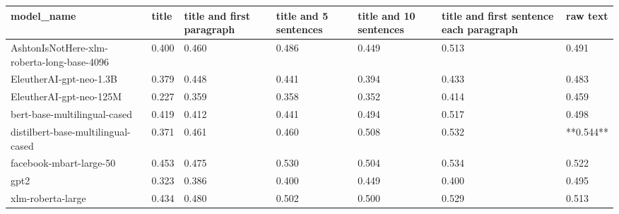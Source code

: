 \begin{tabular}{lllllll}
\toprule
                                model\_name & title & title and first paragraph & title and 5 sentences & title and 10 sentences & title and first sentence each paragraph &  raw text \\
\midrule
AshtonIsNotHere-xlm-roberta-long-base-4096 & 0.400 &                     0.460 &                 0.486 &                  0.449 &                                   0.513 &     0.491 \\
                   EleutherAI-gpt-neo-1.3B & 0.379 &                     0.448 &                 0.441 &                  0.394 &                                   0.433 &     0.483 \\
                   EleutherAI-gpt-neo-125M & 0.227 &                     0.359 &                 0.358 &                  0.352 &                                   0.414 &     0.459 \\
              bert-base-multilingual-cased & 0.419 &                     0.412 &                 0.441 &                  0.494 &                                   0.517 &     0.498 \\
        distilbert-base-multilingual-cased & 0.371 &                     0.461 &                 0.460 &                  0.508 &                                   0.532 & **0.544** \\
                   facebook-mbart-large-50 & 0.453 &                     0.475 &                 0.530 &                  0.504 &                                   0.534 &     0.522 \\
                                      gpt2 & 0.323 &                     0.386 &                 0.400 &                  0.449 &                                   0.400 &     0.495 \\
                         xlm-roberta-large & 0.434 &                     0.480 &                 0.502 &                  0.500 &                                   0.529 &     0.513 \\
\bottomrule
\end{tabular}
